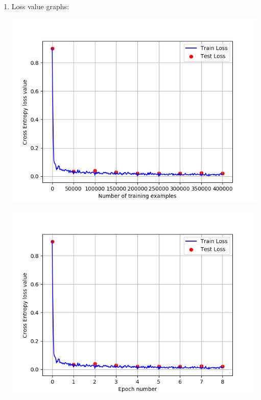 \documentclass[a4paper]{iacas}
\begin{document}
\begin{enumerate}

\item Loss value graphs:

\vskip 0.1in
\begin{minipage}{\linewidth}
	\includegraphics[scale=0.8]{hw2_py/results/_14_01_43/lr_0_01_net_1_L2_norm_/loss_value.png}
	\label{fig_14}
\end{minipage}
\vskip 0.1in
\begin{minipage}{\linewidth}
	\includegraphics[scale=0.8]{hw2_py/results/_14_01_43/lr_0_01_net_1_L2_norm_/loss_value_epoch.png}
	\label{fig_15}
\end{minipage}
\vskip 0.1in


\end{enumerate}
\end{document}
